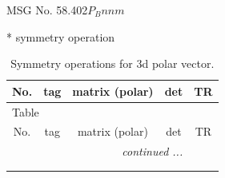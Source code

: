 \documentclass[fleqn,8pt]{jsarticle}
\begin{document}
\setcounter{MaxMatrixCols}{32}

\renewcommand{\tablename}{Table~}
\renewcommand{\figurename}{Figure~}
\begin{center}
\LARGE
MSG No. 58.402\quad$P_{B}nnm$
\end{center}
* symmetry operation
\renewcommand{\arraystretch}{1.3}
\begin{longtable}{ccccc}
\caption{Symmetry operations for 3d polar vector.}
 \\
 \hline \hline
No. & tag & matrix (polar) & det & TR \\ \hline \endfirsthead

\multicolumn{4}{l}{\tablename\ \thetable{}} \\
 \hline \hline
No. & tag & matrix (polar) & det & TR \\ \hline \endhead

 \hline \hline
\multicolumn{4}{r}{\footnotesize\it continued ...} \\ \endfoot

 \hline \hline
\multicolumn{4}{r}{} \\ \endlastfoot


\end{longtable}
\end{document}
